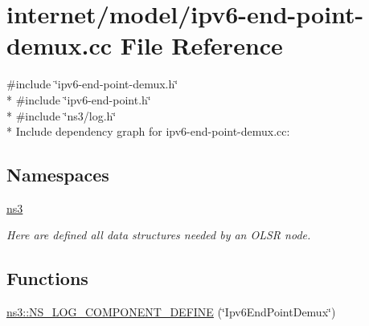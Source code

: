 \hypertarget{ipv6-end-point-demux_8cc}{}\section{internet/model/ipv6-\/end-\/point-\/demux.cc File Reference}
\label{ipv6-end-point-demux_8cc}
{\ttfamily \#include \char`\"{}ipv6-\/end-\/point-\/demux.\+h\char`\"{}}\\*
{\ttfamily \#include \char`\"{}ipv6-\/end-\/point.\+h\char`\"{}}\\*
{\ttfamily \#include \char`\"{}ns3/log.\+h\char`\"{}}\\*
Include dependency graph for ipv6-\/end-\/point-\/demux.cc\+:
\subsection*{Namespaces}
\begin{DoxyCompactItemize}
\item 
 \hyperlink{namespacens3}{ns3}
\begin{DoxyCompactList}\small\item\em Here are defined all data structures needed by an O\+L\+SR node. \end{DoxyCompactList}\end{DoxyCompactItemize}
\subsection*{Functions}
\begin{DoxyCompactItemize}
\item 
\hyperlink{namespacens3_aeb165573d4d05ddf0ef5eae33b2514ee}{ns3\+::\+N\+S\+\_\+\+L\+O\+G\+\_\+\+C\+O\+M\+P\+O\+N\+E\+N\+T\+\_\+\+D\+E\+F\+I\+NE} (\char`\"{}Ipv6\+End\+Point\+Demux\char`\"{})
\end{DoxyCompactItemize}
